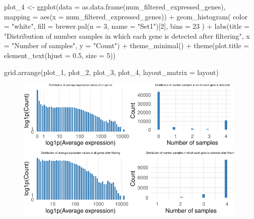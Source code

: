 \documentclass[
  letterpaper,
  DIV=11,
  numbers=noendperiod]{scrartcl}
\newenvironment{Shaded}{\begin{snugshade}}{\end{snugshade}}
\newcommand{\AttributeTok}[1]{\textcolor[rgb]{0.40,0.45,0.13}{#1}}
\newcommand{\DecValTok}[1]{\textcolor[rgb]{0.68,0.00,0.00}{#1}}
\newcommand{\FloatTok}[1]{\textcolor[rgb]{0.68,0.00,0.00}{#1}}
\newcommand{\FunctionTok}[1]{\textcolor[rgb]{0.28,0.35,0.67}{#1}}
\newcommand{\NormalTok}[1]{\textcolor[rgb]{0.00,0.23,0.31}{#1}}
\newcommand{\OtherTok}[1]{\textcolor[rgb]{0.00,0.23,0.31}{#1}}
\newcommand{\SpecialCharTok}[1]{\textcolor[rgb]{0.37,0.37,0.37}{#1}}
\newcommand{\StringTok}[1]{\textcolor[rgb]{0.13,0.47,0.30}{#1}}
\begin{document}
\begin{Shaded}
\begin{Highlighting}[]
\NormalTok{plot\_4 }\OtherTok{\textless{}{-}} \FunctionTok{ggplot}\NormalTok{(}\AttributeTok{data =} \FunctionTok{as.data.frame}\NormalTok{(num\_filtered\_expressed\_genes), }\AttributeTok{mapping =}  \FunctionTok{aes}\NormalTok{(}\AttributeTok{x =}\NormalTok{ num\_filtered\_expressed\_genes)) }\SpecialCharTok{+}
  \FunctionTok{geom\_histogram}\NormalTok{(}
    \AttributeTok{color =} \StringTok{"white"}\NormalTok{,}
    \AttributeTok{fill =} \FunctionTok{brewer.pal}\NormalTok{(}\AttributeTok{n =} \DecValTok{3}\NormalTok{, }\AttributeTok{name =} \StringTok{"Set1"}\NormalTok{)[}\DecValTok{2}\NormalTok{],}
    \AttributeTok{bins =} \DecValTok{23}
\NormalTok{  ) }\SpecialCharTok{+}
  \FunctionTok{labs}\NormalTok{(}\AttributeTok{title =} \StringTok{"Distribution of number samples in which each gene is detected after filtering"}\NormalTok{,}
       \AttributeTok{x =} \StringTok{"Number of samples"}\NormalTok{,}
       \AttributeTok{y =} \StringTok{"Count"}\NormalTok{) }\SpecialCharTok{+}
  \FunctionTok{theme\_minimal}\NormalTok{() }\SpecialCharTok{+}
  \FunctionTok{theme}\NormalTok{(}\AttributeTok{plot.title =} \FunctionTok{element\_text}\NormalTok{(}\AttributeTok{hjust =} \FloatTok{0.5}\NormalTok{,  }\AttributeTok{size =} \DecValTok{5}\NormalTok{))}

\FunctionTok{grid.arrange}\NormalTok{(plot\_1, plot\_2, plot\_3, plot\_4, }\AttributeTok{layout\_matrix =}\NormalTok{ layout)}
\end{Highlighting}
\end{Shaded}

\begin{figure}[H]

{\centering \includegraphics{intro-STAT-GroupProject_files/figure-pdf/unnamed-chunk-8-1.pdf}

}

\end{figure}
\end{document}

